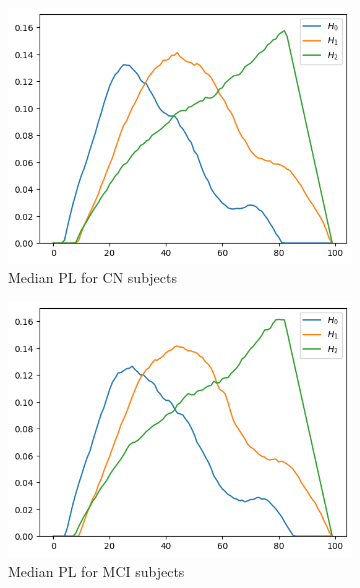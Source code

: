 \documentclass{article}
\begin{document}
\begin{figure}[htb]
  \centering
  \begin{subfigure}{0.32\textwidth}
    \includegraphics[width=\textwidth]{figures/median_pls/median_pl_CN_rep.png}
    \caption{Median PL for CN subjects}
  \end{subfigure}
  \hfill
  \begin{subfigure}{0.32\textwidth}
    \includegraphics[width=\textwidth]{figures/median_pls/median_pl_MCI_rep.png}
    \caption{Median PL for MCI subjects}
  \end{subfigure}
  \hfill
  \begin{subfigure}{0.32\textwidth}

\end{subfigure}
\end{figure}
\end{document}
